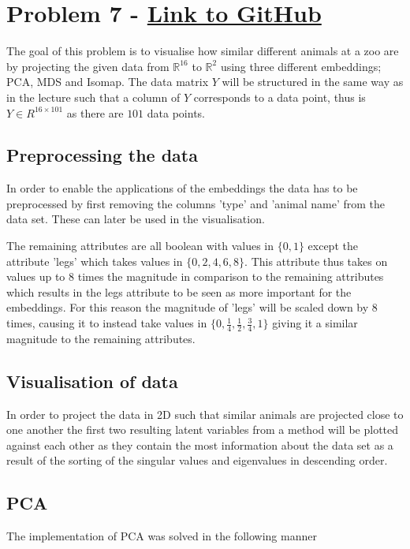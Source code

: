 \section*{Problem 7 - \href{https://github.com/Filipbergentoft/DD2434/tree/main/Assignment%201}{Link to GitHub}}


The goal of this problem is to visualise how similar different animals at a zoo are by projecting the given data from $\mathbb{R}^{16}$ to $\mathbb{R}^{2}$ using three different embeddings; PCA, MDS and Isomap. The data matrix $Y$ will be structured in the same way as in the lecture such that a column of $Y$ corresponds to a data point, thus is $Y \in R^{16 \times 101}$ as there are $101$ data points.

\subsection*{Preprocessing the data}
In order to enable the applications of the embeddings the data has to be preprocessed by first removing the columns 'type' and 'animal name' from the data set. These can later be used in the visualisation.

The remaining attributes are all boolean with values in $\{ 0,1 \}$ except the attribute 'legs' which takes values in $\{ 0, 2, 4, 6, 8 \}$. This attribute thus takes on values up to $8$ times the magnitude in comparison to the remaining attributes which results in the legs attribute to be seen as more important for the embeddings. For this reason the magnitude of 'legs' will be scaled down by $8$ times, causing it to instead take values in  $\{ 0, \frac{1}{4}, \frac{1}{2}, \frac{3}{4}, 1 \}$ giving it a similar magnitude to the remaining attributes.

\subsection*{Visualisation of data}
In order to project the data in 2D such that similar animals are projected close to one another the first two resulting latent variables from a method will be plotted against each other as they contain the most information about the data set as a result of the sorting of the singular values and eigenvalues in descending order.


\subsection*{PCA}
The implementation of PCA was solved in the following manner

